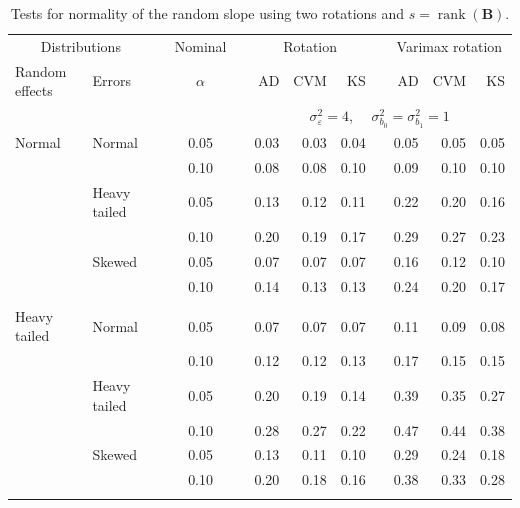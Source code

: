 \documentclass[12pt]{article} %
\DeclareMathOperator{\rank}{rank}
\begin{document}
\begin{table}[ht]
\caption{Tests for normality of the random slope using two rotations and $s = \rank(\bm{B})$.}
\begin{scriptsize}
\begin{center}
\begin{tabular}{ll p{.1cm} c p{.1cm} rrr p{.1cm} rrr}
  \hline
  \multicolumn{2}{c}{Distributions}& & Nominal & &  \multicolumn{3}{c}{Rotation} & & \multicolumn{3}{c}{Varimax rotation} \\ \cline{1-2} \cline{6-8} \cline{10-12}   
  Random effects & Errors & & $\alpha$ & & AD & CVM & KS & & AD & CVM & KS \\ 
   \hline
& && && \multicolumn{7}{c}{$\sigma_{\varepsilon}^2 = 4$, \ \ $\sigma_{b_0}^2 = \sigma_{b_1}^2 = 1$} \\ \cline{6-12}
\rowcolor{gray!20}Normal       & Normal       && 0.05 &&  0.03 & 0.03 & 0.04 && 0.05 & 0.05 & 0.05 \\ 
\rowcolor{gray!20}             &              && 0.10 &&  0.08 & 0.08 & 0.10 && 0.09 & 0.10 & 0.10 \\ 
\rowcolor{gray!20}             & Heavy tailed && 0.05 &&  0.13 & 0.12 & 0.11 && 0.22 & 0.20 & 0.16 \\ 
\rowcolor{gray!20}             &              && 0.10 &&  0.20 & 0.19 & 0.17 && 0.29 & 0.27 & 0.23 \\ 
\rowcolor{gray!20}             & Skewed       && 0.05 &&  0.07 & 0.07 & 0.07 && 0.16 & 0.12 & 0.10 \\ 
\rowcolor{gray!20}             &              && 0.10 &&  0.14 & 0.13 & 0.13 && 0.24 & 0.20 & 0.17 \\ 
             &&&&&&&&&&&\\
Heavy tailed & Normal       && 0.05 &&  0.07 & 0.07 & 0.07 && 0.11 & 0.09 & 0.08 \\ 
             &              && 0.10 &&  0.12 & 0.12 & 0.13 && 0.17 & 0.15 & 0.15 \\ 
             & Heavy tailed && 0.05 &&  0.20 & 0.19 & 0.14 && 0.39 & 0.35 & 0.27 \\ 
             &              && 0.10 &&  0.28 & 0.27 & 0.22 && 0.47 & 0.44 & 0.38 \\ 
             & Skewed       && 0.05 &&  0.13 & 0.11 & 0.10 && 0.29 & 0.24 & 0.18 \\ 
             &              && 0.10 &&  0.20 & 0.18 & 0.16 && 0.38 & 0.33 & 0.28 \\ 
             &&&&&&&&&&&\\

\end{tabular}
\end{center}
\end{scriptsize}
\end{table}
\end{document}
